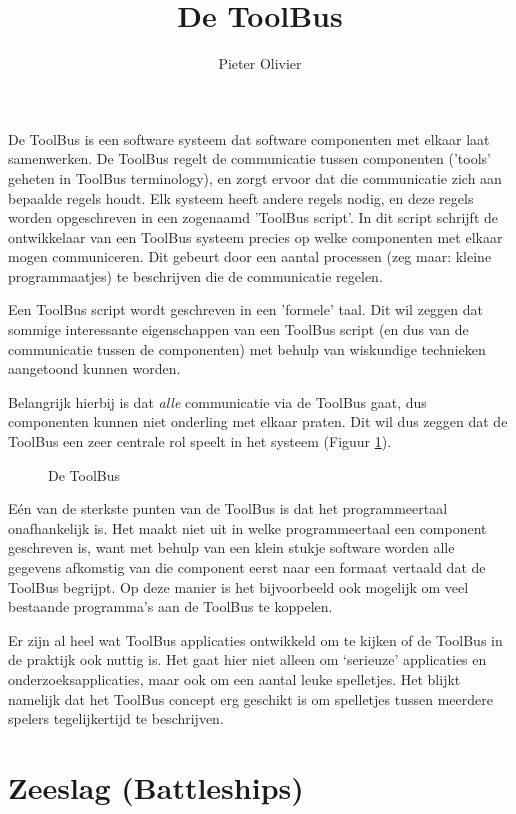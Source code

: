 \documentclass[a4]{article}
\title{De ToolBus}
\author{Pieter Olivier}
\begin{document}
\maketitle

De ToolBus is een software systeem dat software componenten met
elkaar laat samenwerken. 
De ToolBus regelt de communicatie tussen componenten
('tools' geheten in ToolBus terminology),
en zorgt ervoor dat die communicatie zich aan bepaalde regels houdt.
Elk systeem heeft andere regels nodig, en deze regels worden opgeschreven
in een zogenaamd 'ToolBus script'. In dit script schrijft de ontwikkelaar
van een ToolBus systeem precies op welke componenten
met elkaar mogen communiceren. Dit gebeurt door een aantal processen
(zeg maar: kleine programmaatjes) te beschrijven die de communicatie
regelen.

Een ToolBus script wordt geschreven in
een 'formele' taal. Dit wil zeggen dat sommige interessante eigenschappen
van een ToolBus script (en dus van de communicatie tussen de componenten)
met behulp van wiskundige technieken aangetoond kunnen worden.

Belangrijk hierbij is dat \emph{alle} communicatie via de ToolBus
gaat, dus componenten kunnen niet onderling met elkaar praten.
Dit wil dus zeggen dat de ToolBus een zeer centrale rol speelt in
het systeem (Figuur \ref{toolbus}).

\begin{figure}[htb]
\centerline{}
\caption{De ToolBus}
\label{toolbus}
\end{figure}

E\'en van de sterkste punten van de ToolBus is dat het programmeertaal
onafhankelijk is. Het maakt niet uit in welke programmeertaal een component
geschreven is, want met behulp van een klein stukje software worden alle
gegevens afkomstig van die component eerst naar een formaat vertaald
dat de ToolBus begrijpt. Op deze manier is het bijvoorbeeld ook mogelijk
om veel bestaande programma's aan de ToolBus te koppelen.

Er zijn al heel wat ToolBus applicaties ontwikkeld om te kijken
of de ToolBus in de praktijk ook nuttig is. Het gaat hier niet alleen om 
`serieuze' applicaties en onderzoeksapplicaties, maar ook om een aantal
leuke spelletjes. Het blijkt namelijk dat het ToolBus concept erg
geschikt is om spelletjes tussen meerdere spelers tegelijkertijd te
beschrijven.

\section*{Zeeslag (Battleships)}
\end{document}
